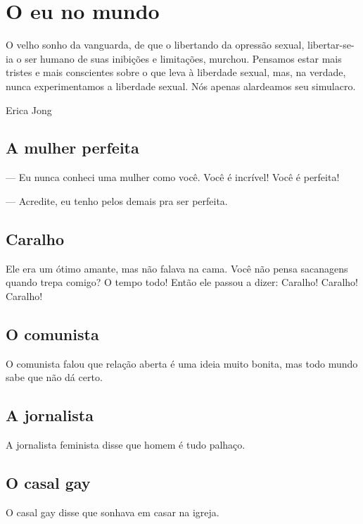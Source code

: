 \part{O eu no mundo} 

\thispagestyle{empty}\vspace*{.4\textwidth} 

\epigraph{O velho sonho da vanguarda, de que o libertando da opressão sexual,
libertar-se-ia o ser humano de suas inibições e limitações, murchou.
Pensamos estar mais tristes e mais conscientes sobre o que leva à
liberdade sexual, mas, na verdade, nunca experimentamos a liberdade
sexual. Nós apenas alardeamos seu simulacro.}{Erica Jong} 

\chapter{A mulher perfeita}

\mbox{}\indent{}--- Eu nunca conheci uma mulher como você. Você é incrível! Você é
perfeita!

--- Acredite, eu tenho pelos demais pra ser perfeita.

\chapter{Caralho}

Ele era um ótimo amante, mas não falava na cama. Você não pensa
sacanagens quando trepa comigo? O tempo todo! Então ele passou a dizer:
Caralho! Caralho! Caralho!

\chapter{O comunista}

O comunista falou que relação aberta é uma ideia muito bonita, mas todo
mundo sabe que não dá certo.

\chapter{A jornalista}

A jornalista feminista disse que homem é tudo palhaço.

\chapter{O casal gay}

O casal gay disse que sonhava em casar na igreja.

